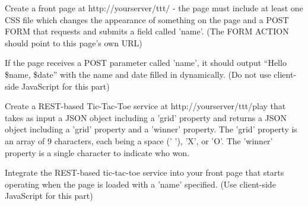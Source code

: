\documentclass[fancy,11pt,titlestyle=display]{style/elegantbook}
\begin{document}
\begin{problemset}
    \item Create a front page at http://yourserver/ttt/ - the page must include at least one CSS file which changes the appearance of something on the page and a POST FORM that requests and submits a field called 'name'. (The FORM ACTION should point to this page's own URL)
    \item If the page receives a POST parameter called 'name', it should output ``Hello \$name, \$date'' with the name and date filled in dynamically. (Do not use client-side JavaScript for this part)
    \item Create a REST-based Tic-Tac-Toe service at http://yourserver/ttt/play that takes as input a JSON object including a 'grid' property and returns a JSON object including a 'grid' property and a 'winner' property. The 'grid' property is an array of 9 characters, each being a space (' '), 'X', or 'O'. The 'winner' property is a single character to indicate who won.
    \item Integrate the REST-based tic-tac-toe service into your front page that starts operating when the page is loaded with a 'name' specified. (Use client-side JavaScript for this part)
\end{problemset}
\end{document}
